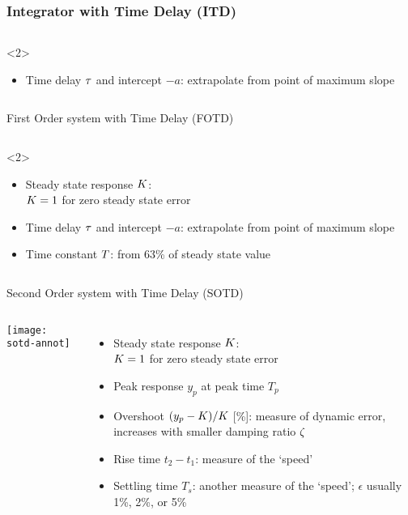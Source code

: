 \documentclass{beamer-control}
\begin{document}
\begin{frame}
\frametitle{Integrator with Time Delay (ITD)}
\begin{columns}
%
%

\scriptsize
\begin{uncoverenv}<2>
\begin{itemize}
\item Time delay $\tau$ and intercept $-a$: extrapolate from point of maximum slope
\end{itemize}
\end{uncoverenv}
\end{columns}
\end{frame}

\begin{frame}{First Order system with Time Delay (FOTD)}
\begin{columns}
%
%

\scriptsize
\begin{uncoverenv}<2>
\begin{itemize}
\item Steady state response $K$:\\ $K=1$ for zero steady state error
\item Time delay $\tau$ and intercept $-a$: extrapolate from point of maximum slope
\item Time constant $T$: from 63\% of steady state value
\end{itemize}
\end{uncoverenv}
\end{columns}
\end{frame}


\begin{frame}{Second Order system with Time Delay (SOTD)}
\begin{columns}
\texttt{[image: sotd-annot]}

\scriptsize
\begin{itemize}
\item Steady state response $K$:\\ $K=1$ for zero steady state error
\item Peak response $y_p$ at peak time $T_p$
\item Overshoot $(y_p-K)/K$ [\%]: measure of dynamic error, increases with smaller damping ratio $\zeta$
\item Rise time $t_2-t_1$: measure of the `speed'
\item Settling time $T_s$: another measure of the `speed'; $\epsilon$ usually 1\%, 2\%, or 5\%
\end{itemize}
\end{columns}
\end{frame}
\end{document}
